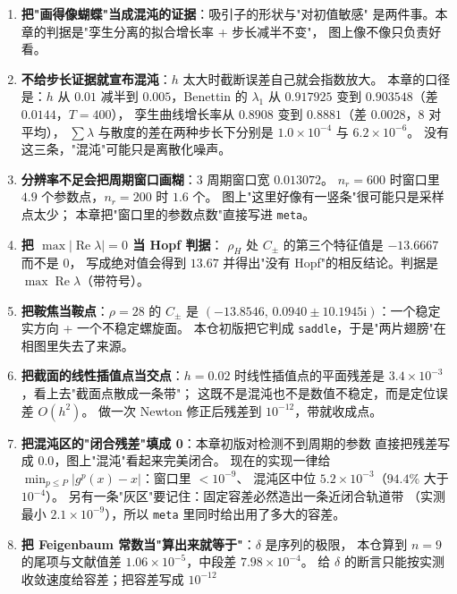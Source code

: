\begin{enumerate}
  \item \textbf{把"画得像蝴蝶"当成混沌的证据}：吸引子的形状与"对初值敏感"
        是两件事。本章的判据是"孪生分离的拟合增长率 + 步长减半不变"，
        图上像不像只负责好看。
  \item \textbf{不给步长证据就宣布混沌}：$h$ 太大时截断误差自己就会指数放大。
        本章的口径是：$h$ 从 $0.01$ 减半到 $0.005$，Benettin 的 $\lambda_1$ 从
        $0.917925$ 变到 $0.903548$（差 $0.0144$，$T=400$），
        孪生曲线增长率从 $0.8908$ 变到 $0.8881$（差 $0.0028$，$8$ 对平均），
        $\sum\lambda$ 与散度的差在两种步长下分别是 $1.0\times10^{-4}$ 与
        $6.2\times10^{-6}$。
        没有这三条，"混沌"可能只是离散化噪声。
  \item \textbf{分辨率不足会把周期窗口画糊}：3 周期窗口宽 $0.013072$。
        $n_r=600$ 时窗口里 $4.9$ 个参数点，$n_r=200$ 时 $1.6$ 个。
        图上"这里好像有一竖条"很可能只是采样点太少；
        本章把"窗口里的参数点数"直接写进 \texttt{meta}。
  \item \textbf{把 $\max|\operatorname{Re}\lambda|=0$ 当 Hopf 判据}：
        $\rho_H$ 处 $C_\pm$ 的第三个特征值是 $-13.6667$ 而不是 $0$，
        写成绝对值会得到 $13.67$ 并得出"没有 Hopf"的相反结论。判据是
        $\max\operatorname{Re}\lambda$（带符号）。
  \item \textbf{把鞍焦当鞍点}：$\rho=28$ 的 $C_\pm$ 是
        $(-13.8546,\,0.0940\pm10.1945\mathrm{i})$：一个稳定实方向 + 一个不稳定螺旋面。
        本仓初版把它判成 \texttt{saddle}，于是"两片翅膀"在相图里失去了来源。
  \item \textbf{把截面的线性插值点当交点}：$h=0.02$ 时线性插值点的平面残差是
        $3.4\times10^{-3}$，看上去"截面点散成一条带"；
        这既不是混沌也不是数值不稳定，而是定位误差 $O(h^2)$。
        做一次 Newton 修正后残差到 $10^{-12}$，带就收成点。
  \item \textbf{把混沌区的"闭合残差"填成 0}：本章初版对检测不到周期的参数
        直接把残差写成 $0.0$，图上"混沌"看起来完美闭合。
        现在的实现一律给 $\min_{p\le P}|g^p(x)-x|$：窗口里 $<10^{-9}$、
        混沌区中位 $5.2\times10^{-3}$（$94.4\%$ 大于 $10^{-4}$）。
        另有一条"灰区"要记住：固定容差必然造出一条近闭合轨道带
        （实测最小 $2.1\times10^{-9}$），所以 \texttt{meta} 里同时给出用了多大的容差。
  \item \textbf{把 Feigenbaum 常数当"算出来就等于"}：$\delta$ 是序列的极限，
        本仓算到 $n=9$ 的尾项与文献值差 $1.06\times10^{-5}$，中段差 $7.98\times10^{-4}$。
        给 $\delta$ 的断言只能按实测收敛速度给容差；把容差写成 $10^{-12}$

\end{enumerate}
